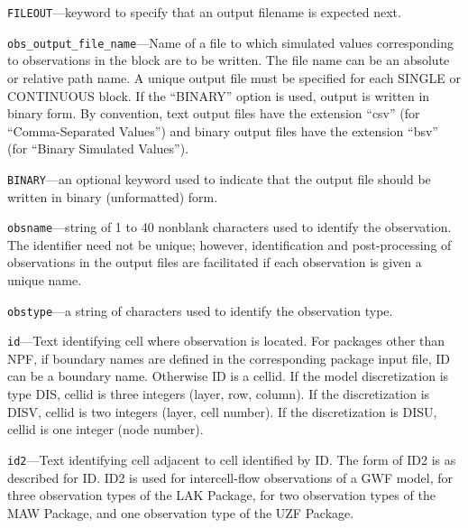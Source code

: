\begin{description}
\item \texttt{FILEOUT}---keyword to specify that an output filename is expected next.

\item \texttt{obs\_output\_file\_name}---Name of a file to which simulated values corresponding to observations in the block are to be written. The file name can be an absolute or relative path name. A unique output file must be specified for each SINGLE or CONTINUOUS block. If the ``BINARY'' option is used, output is written in binary form. By convention, text output files have the extension ``csv'' (for ``Comma-Separated Values'') and binary output files have the extension ``bsv'' (for ``Binary Simulated Values'').

\item \texttt{BINARY}---an optional keyword used to indicate that the output file should be written in binary (unformatted) form.

\item \texttt{obsname}---string of 1 to 40 nonblank characters used to identify the observation. The identifier need not be unique; however, identification and post-processing of observations in the output files are facilitated if each observation is given a unique name.

\item \texttt{obstype}---a string of characters used to identify the observation type.

\item \texttt{id}---Text identifying cell where observation is located. For packages other than NPF, if boundary names are defined in the corresponding package input file, ID can be a boundary name. Otherwise ID is a cellid. If the model discretization is type DIS, cellid is three integers (layer, row, column). If the discretization is DISV, cellid is two integers (layer, cell number). If the discretization is DISU, cellid is one integer (node number).

\item \texttt{id2}---Text identifying cell adjacent to cell identified by ID. The form of ID2 is as described for ID. ID2 is used for intercell-flow observations of a GWF model, for three observation types of the LAK Package, for two observation types of the MAW Package, and one observation type of the UZF Package.

\end{description}


